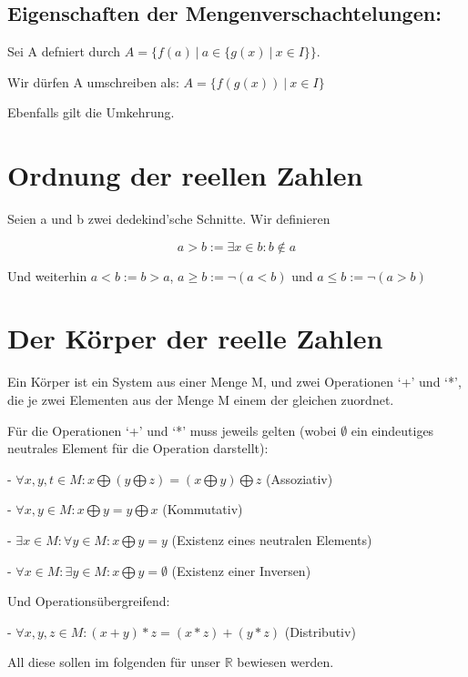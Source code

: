 \documentclass[12pt]{article}
\begin{document}
    \subsection{Eigenschaften der Mengenverschachtelungen:}

    Sei A defniert durch $A = \{f(a) \mspace{4mu} | \mspace{4mu} a \in \{g(x) \mspace{4mu} | \mspace{4mu}  x \in I\}\}$.

    Wir dürfen A umschreiben als:
    $A = \{f(g(x)) \mspace{4mu} | \mspace{4mu} x \in I\}$

    Ebenfalls gilt die Umkehrung.


    \section{Ordnung der reellen Zahlen}

    Seien a und b zwei dedekind'sche Schnitte. Wir definieren

    \[a > b := \exists x \in b: b \not \in a\]

    Und weiterhin $a < b := b > a$, $a \ge b := \lnot (a < b)$ und $a \le b := \lnot (a > b)$

    \section{Der Körper der reelle Zahlen}

    Ein Körper ist ein System aus einer Menge M, und zwei Operationen `+' und `*', die je zwei Elementen aus der Menge
    M einem der gleichen zuordnet.

    Für die Operationen `+' und `*' muss jeweils gelten (wobei $\emptyset$ ein eindeutiges neutrales Element für
    die Operation darstellt):

    - $\forall x, y, t \in M: x \bigoplus (y \bigoplus z) = (x \bigoplus y) \bigoplus z$  (Assoziativ)

    - $\forall x, y \in M: x \bigoplus y = y \bigoplus x$  (Kommutativ)

    - $\exists x \in M: \forall y \in M: x \bigoplus y = y$  (Existenz eines neutralen Elements)

    - $\forall x \in M: \exists y \in M: x \bigoplus y = \emptyset$  (Existenz einer Inversen)

    Und Operationsübergreifend:

    - $\forall x, y, z \in M: (x + y) * z = (x * z) + (y * z)$ (Distributiv)

    All diese sollen im folgenden für unser $\mathbb{R}$ bewiesen werden.
\end{document}
